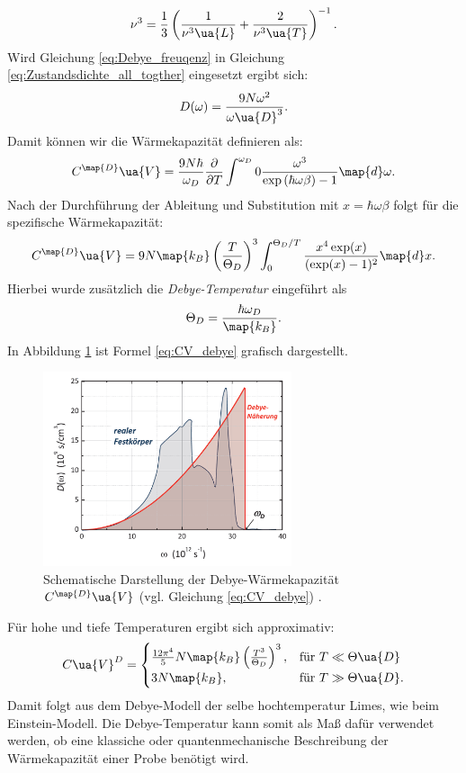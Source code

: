 \begin{equation*}
  \nu^3= \frac{1}{3}\left(\frac{1}{\nu^3\ua{L}} + \frac{2}{\nu^3\ua{T}}\right)^{-1}.
\end{equation*}
Wird Gleichung \eqref{eq:Debye_freuqenz} in Gleichung \eqref{eq:Zustandsdichte_all_togther}
eingesetzt ergibt sich:
\begin{equation}
  \label{eq:Zustandsdichte_Debye}
  D(\omega)= \frac{9N\omega^2}{\omega\ua{D}^3}.
\end{equation}
Damit können wir die Wärmekapazität definieren als:
\begin{equation}
  \label{eq:CVD_ohne_x}
  C^{\map{D}}\ua{V}=\frac{9N\hbar}{\omega_D}\frac{\partial}{\partial T}\int^{\omega_D}{0}\frac{\omega^3}{\exp\left(\hbar\omega\beta\right)-1} \map{d}\omega.
\end{equation}
Nach der Durchführung der Ableitung und Substitution mit $x=\hbar\omega\beta$
folgt für die spezifische Wärmekapazität:
\begin{equation}
  \label{eq:CV_debye}
  C^{\map{D}}\ua{V}=9N\map{k_B}\left(\frac{T}{\Theta_D}\right)^3\int^{\Theta_D/T}_{0} \frac{x^4\exp(x)}{(\exp(x)-1)^2}\map{d}x.
\end{equation}
Hierbei wurde zusätzlich die \emph{Debye-Temperatur} eingeführt als
\begin{equation}
  \label{eq:Debye_Temp}
  \Theta_D = \frac{\hbar\omega_D}{\map{k_B}}.
\end{equation}
In Abbildung \ref{fig: CVD_plot} ist Formel \eqref{eq:CV_debye} grafisch dargestellt.
\begin{figure}
  \centering
  \includegraphics[width = 0.65\textwidth]{./content/images/debye.PNG}
  \caption{Schematische Darstellung der Debye-Wärmekapazität $C^{\map{D}}\ua{V}$ (vgl. Gleichung \eqref{eq:CV_debye})  \cite[S. 228]{marx}.}
  \label{fig: CVD_plot}
\end{figure}
Für hohe und tiefe Temperaturen ergibt sich approximativ:
\begin{equation}
  C\ua{V}^{D}=
  \begin{cases}
    \frac{12\pi^4}{5}N\map{k_B}\left(\frac{T^3}{\Theta_D}\right)^3, &\text{für } T\ll\Theta\ua{D}  \\
     3N\map{k_B}, & \text{für } T \gg \Theta\ua{D}.
  \end{cases}
\end{equation}
Damit folgt aus dem Debye-Modell der selbe hochtemperatur Limes, wie beim Einstein-Modell.
Die Debye-Temperatur kann somit als Maß dafür verwendet werden, ob eine klassiche
oder quantenmechanische Beschreibung der Wärmekapazität einer Probe benötigt wird.

